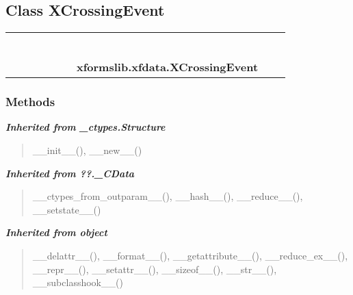 \subsection{Class XCrossingEvent}

    \label{xformslib:xfdata:XCrossingEvent}
\begin{tabular}{cccccccccc}
\multicolumn{2}{r}{\settowidth{\BCL}{object}\multirow{2}{\BCL}{object}}
&&
&&
&&
  \\\cline{3-3}
  &&\multicolumn{1}{c|}{}
&&
&&
&&
  \\
\multicolumn{4}{r}{\settowidth{\BCL}{??.\_CData}\multirow{2}{\BCL}{??.\_CData}}
&&
&&
  \\\cline{5-5}
  &&&&\multicolumn{1}{c|}{}
&&
&&
  \\
\multicolumn{6}{r}{\settowidth{\BCL}{\_ctypes.Structure}\multirow{2}{\BCL}{\_ctypes.Structure}}
&&
  \\\cline{7-7}
  &&&&&&\multicolumn{1}{c|}{}
&&
  \\
&&&&&&\multicolumn{2}{l}{\textbf{xformslib.xfdata.XCrossingEvent}}
\end{tabular}



  \subsubsection{Methods}


\large{\textbf{\textit{Inherited from \_ctypes.Structure}}}

\begin{quote}
\_\_init\_\_(), \_\_new\_\_()
\end{quote}

\large{\textbf{\textit{Inherited from ??.\_CData}}}

\begin{quote}
\_\_ctypes\_from\_outparam\_\_(), \_\_hash\_\_(), \_\_reduce\_\_(), \_\_setstate\_\_()
\end{quote}

\large{\textbf{\textit{Inherited from object}}}

\begin{quote}
\_\_delattr\_\_(), \_\_format\_\_(), \_\_getattribute\_\_(), \_\_reduce\_ex\_\_(), \_\_repr\_\_(), \_\_setattr\_\_(), \_\_sizeof\_\_(), \_\_str\_\_(), \_\_subclasshook\_\_()
\end{quote}

